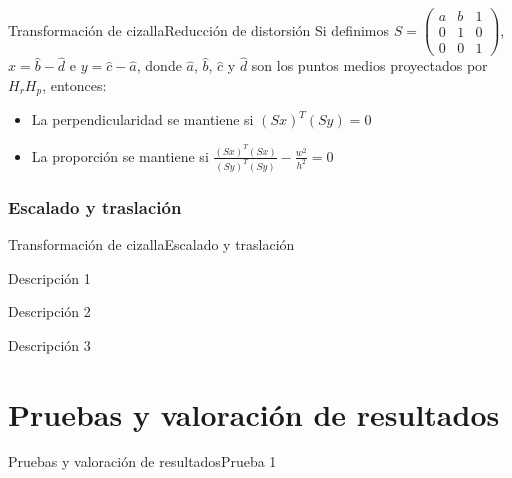 \documentclass[aspectratio=169,14pt,spanish]{beamer}
\begin{document}
          \begin{frame}{Transformación de cizalla}{Reducción de distorsión}
              Si definimos $S = \begin{pmatrix}
                  a & b & 1\\
                  0 & 1 & 0\\
                  0 & 0 & 1
              \end{pmatrix}$, $x = \hat{b} - \hat{d}$ e $y = \hat{c} - \hat{a}$, donde $\hat{a}$, $\hat{b}$, $\hat{c}$ y $\hat{d}$ son los puntos medios proyectados por $H_r H_p$, entonces:

              \begin{itemize}
                  \item<2-> La perpendicularidad se mantiene si $(Sx)^T (Sy) = 0$
                  \item<3-> La proporción se mantiene si $\frac{(Sx)^T (Sx)}{(Sy)^T (Sy)} - \frac{w^2}{h^2} = 0$
              \end{itemize}
          \end{frame}

        \subsubsection{Escalado y traslación}
          \begin{frame}{Transformación de cizalla}{Escalado y traslación}

              \begin{description}[<+->]
                  \item [Primer ítem] Descripción 1
                  \item [Segundo ítem] Descripción 2
                  \item [Tercer ítem] Descripción 3
              \end{description}
          \end{frame}




    \section{Pruebas y valoración de resultados}

      \begin{frame}{Pruebas y valoración de resultados}{Prueba 1}


      \end{frame}
\end{document}
